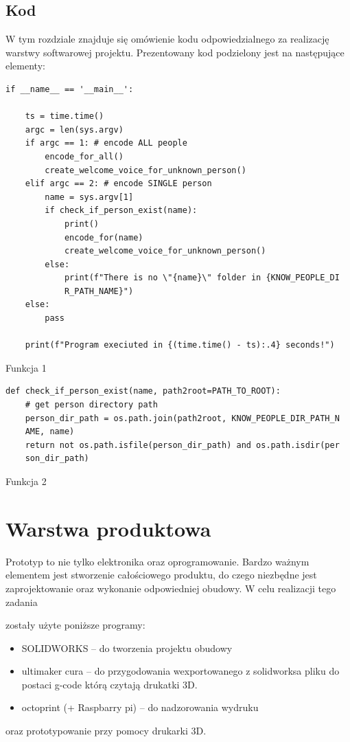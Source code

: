 \documentclass[a4paper,12pt,reqno]{article}
\begin{document}
\subsection{Kod}
W tym rozdziale znajduje się omówienie kodu odpowiedzialnego za realizację warstwy softwarowej projektu.
Prezentowany kod podzielony jest na następujące elementy:

\begin{listing}
\begin{mdframed}[backgroundcolor=codebg]
\begin{verbatim}
if __name__ == '__main__':

    ts = time.time()
    argc = len(sys.argv)
    if argc == 1: # encode ALL people
        encode_for_all()
        create_welcome_voice_for_unknown_person()
    elif argc == 2: # encode SINGLE person
        name = sys.argv[1]
        if check_if_person_exist(name):
            print()
            encode_for(name)
            create_welcome_voice_for_unknown_person()
        else:
            print(f"There is no \"{name}\" folder in {KNOW_PEOPLE_DI
            R_PATH_NAME}")
    else:
        pass

    print(f"Program execiuted in {(time.time() - ts):.4} seconds!")
\end{verbatim}
\end{mdframed}
\caption{Funkcja 1}
\label{listing:py1}
\end{listing}

\begin{listing}
\begin{mdframed}[backgroundcolor=codebg]
\begin{verbatim}
def check_if_person_exist(name, path2root=PATH_TO_ROOT):
    # get person directory path
    person_dir_path = os.path.join(path2root, KNOW_PEOPLE_DIR_PATH_N
    AME, name)
    return not os.path.isfile(person_dir_path) and os.path.isdir(per
    son_dir_path)
\end{verbatim}
\end{mdframed}
\caption{Funkcja 2}
\label{listing:py2}
\end{listing}

\newpage
\section{Warstwa produktowa} \label{section:warstwa_produkcyjna} %
Prototyp to nie tylko elektronika oraz oprogramowanie. Bardzo ważnym elementem jest stworzenie całościowego produktu, do czego niezbędne jest zaprojektowanie oraz wykonanie odpowiedniej obudowy. W celu realizacji tego zadania \textcolor{new}{zostały użyte poniższe programy:
\begin{itemize}
\item SOLIDWORKS – do tworzenia projektu obudowy
\item ultimaker cura – do przygodowania wexportowanego z solidworksa pliku do postaci g-code którą czytają drukatki 3D.
\item octoprint (+ Raspbarry pi) – do nadzorowania wydruku
\end{itemize}}
oraz prototypowanie przy pomocy drukarki 3D.
\end{document}
